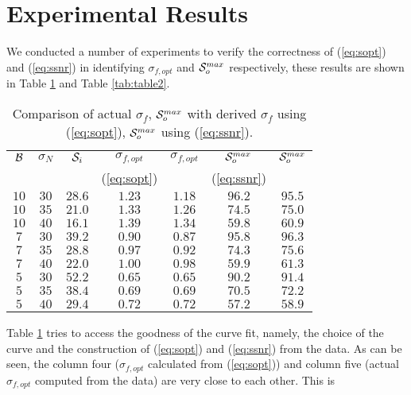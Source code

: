 \documentclass[journal,onecolumn]{IEEEtran}
\newcommand{\Noise}{N}
\newcommand{\g}{f}
\renewcommand{\S}{{\cal S}}
\newcommand{\BW}{{\cal B}}
\begin{document}
\section{Experimental Results}
\label{sec:experimental_results}

We conducted a number of experiments to verify the correctness of
(\ref{eq:sopt}) and (\ref{eq:ssnr}) in identifying $\sigma_{\g,opt}$ and
$\S_o^{max}$ respectively, these results are shown 
in Table \ref{tab:table1} and Table \ref{tab:table2}.
\begin{table}
\begin{center}
\begin{tabular}{|c|c|c|c|c|c|c|}
\hline \hline
$\BW$ & $\sigma_\Noise$ & $\S_i$ & $\sigma_{\g,opt}$  &  $\sigma_{\g,opt}$& 
$\S_{o}^{max}$ & $\S_{o}^{max}$ \\
&  &  & (\ref{eq:sopt}) &  & (\ref{eq:ssnr})&  \\
\hline \hline
$10$ & $30$ & $28.6$ & $1.23$ & $1.18$ & $96.2$ & $95.5$ \\ \hline
$10$ & $35$ & $21.0$ & $1.33$ & $1.26$ & $74.5$ & $75.0$ \\ \hline
$10$ & $40$ & $16.1$ & $1.39$ & $1.34$ & $59.8$ & $60.9$ \\ \hline \hline
$7$ & $30$ & $39.2$ & $0.90$ & $0.87$ & $95.8$ & $96.3$ \\ \hline
$7$ & $35$ & $28.8$ & $0.97$ & $0.92$ & $74.3$ & $75.6$ \\ \hline
$7$ & $40$ & $22.0$ & $1.00$ & $0.98$ & $59.9$ & $61.3$ \\ \hline \hline
$5$ & $30$ & $52.2$ & $0.65$ & $0.65$ & $90.2$ & $91.4$ \\ \hline
$5$ & $35$ & $38.4$ & $0.69$ & $0.69$ & $70.5$ & $72.2$ \\ \hline
$5$ & $40$ & $29.4$ & $0.72$ & $0.72$ & $57.2$ & $58.9$ \\ \hline
\end{tabular}
\caption{Comparison of actual $\sigma_\g$, $\S_o^{max}$ with derived
$\sigma_\g$ using (\ref{eq:sopt}), $\S_o^{max}$ using (\ref{eq:ssnr}).}
\label{tab:table1}
\end{center}
\end{table}
Table \ref{tab:table1} tries to access the goodness of the curve fit, namely,
the choice of the curve and the construction of (\ref{eq:sopt}) 
and (\ref{eq:ssnr}) from the data. 
As can be seen, the column four ($\sigma_{\g,opt}$ calculated from
(\ref{eq:sopt})) and column five (actual
$\sigma_{\g,opt}$ computed from the data) are very close to each other. This is
\end{document}
